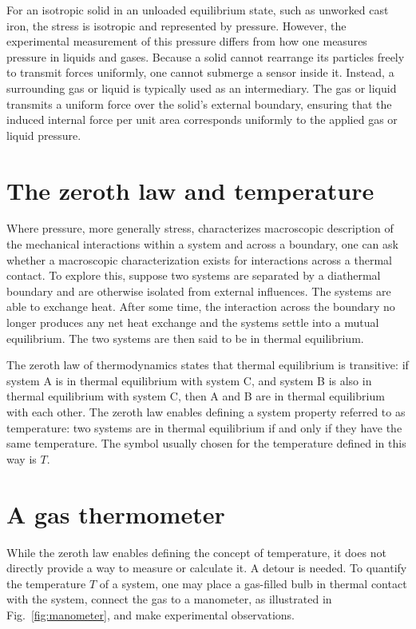 For an isotropic solid in an unloaded equilibrium state, such as unworked cast iron, the stress is isotropic and represented by pressure. However, the experimental measurement of this pressure differs from how one measures pressure in liquids and gases. Because a solid cannot rearrange its particles freely to transmit forces uniformly, one cannot submerge a sensor inside it. Instead, a surrounding gas or liquid is typically used as an intermediary. The gas or liquid transmits a uniform force over the solid's external boundary, ensuring that the induced internal force per unit area corresponds uniformly to the applied gas or liquid pressure. 

\section{The zeroth law and temperature}
Where pressure, more generally stress, characterizes macroscopic description of the mechanical interactions within a system and across a boundary, one can ask whether a macroscopic characterization exists for interactions across a thermal contact.  To explore this, suppose two systems are separated by a diathermal boundary and are otherwise isolated from external influences. The systems are able to exchange heat. After some time, the interaction across the boundary no longer produces any net heat exchange and the systems settle into a mutual equilibrium. The two systems are then said to be in thermal equilibrium. 

The zeroth law of thermodynamics states that thermal equilibrium is transitive: if system A is in thermal equilibrium with system C, and system B is also in thermal equilibrium with system C, then A and B are in thermal equilibrium with each other. 
The zeroth law enables defining a system property referred to as temperature: two systems are in thermal equilibrium if and only if they have the same temperature. The symbol usually chosen for the temperature defined in this way is $T$.

\section{A gas thermometer}
While the zeroth law enables defining the concept of temperature, it does not directly provide a way to measure or calculate it. A detour is needed. To quantify the temperature $T$ of a system, one may place a gas-filled bulb in thermal contact with the system, connect the gas to a manometer, as illustrated in Fig.~\ref{fig:manometer}, and make experimental observations.


